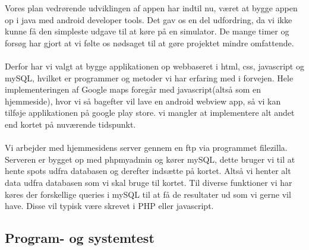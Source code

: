 \documentclass[12pt]{article}
\begin{document}
Vores plan vedrørende udviklingen af appen har indtil nu, været at bygge appen op i java med android developer tools. Det gav os en del udfordring, da vi ikke kunne få den simpleste udgave til at køre på en simulator. De mange timer og forsøg har gjort at vi følte os nødsaget til at gøre projektet mindre omfattende. 
\\\\
Derfor har vi valgt at bygge applikationen op webbaseret i html, css, javascript og mySQL, hvilket er programmer og metoder vi har erfaring med i forvejen. 
Hele implementeringen af Google maps foregår med javascript(altså som en hjemmeside), hvor vi så bagefter vil lave en android webview app, så vi kan tilføje applikationen på google play store. vi mangler at implementere alt andet end kortet på nuværende tidspunkt.\\\\
Vi arbejder med hjemmesidens server gennem en ftp via programmet filezilla. Serveren er bygget op med phpmyadmin og kører mySQL, dette bruger vi til at hente spots udfra databasen og derefter indsætte på kortet. Altså vi henter alt data udfra databasen som vi skal bruge til kortet. Til diverse funktioner vi har køres der forskellige queries i mySQL til at få de resultater ud som vi gerne vil have. Disse vil typisk være skrevet i PHP eller javascript.

\pagebreak

\subsection{Program- og systemtest}
\end{document}
